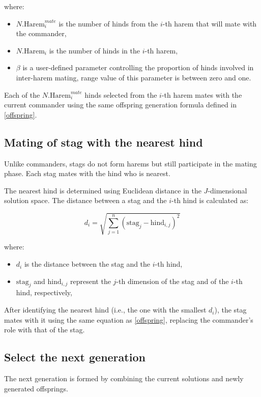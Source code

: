 \documentclass[pdflatex,sn-mathphys-num]{sn-jnl}%
\theoremstyle{thmstyleone}%
\theoremstyle{thmstyletwo}%
\theoremstyle{thmstylethree}%
\begin{document}
\noindent where:
\begin{itemize}
    \item $N.{\text{Harem}_i^{mate}}$ is the number of hinds from the $i$-th harem that will mate with the commander,
    \item $N.{\text{Harem}_i}$ is the number of hinds in the $i$-th harem,
    \item $\beta$ is a user-defined parameter controlling the proportion of hinds involved in inter-harem mating, range value of this parameter is between zero and one.
\end{itemize}

Each of the $N.{\text{Harem}_i^{mate}}$ hinds selected from the $i$-th harem mates with the current commander using the same offspring generation formula defined in \ref{offspring}. 

\subsection{Mating of stag with the nearest hind}\label{subsec4.8}
Unlike commanders, stags do not form harems but still participate in the mating phase. Each stag mates with the hind who is nearest.

The nearest hind is determined using Euclidean distance in the $J$-dimensional solution space. The distance between a stag and the $i$-th hind is calculated as:

\begin{equation}
d_i = \sqrt{ \sum_{j=1}^{n} (\text{stag}_j - \text{hind}_{i,j})^2 }
\end{equation}

\noindent where:
\begin{itemize}
    \item $d_i$ is the distance between the stag and the $i$-th hind,
    \item $\text{stag}_j$ and $\text{hind}_{i,j}$ represent the $j$-th dimension of the stag and of the $i$-th hind, respectively,
\end{itemize}

After identifying the nearest hind (i.e., the one with the smallest $d_i$), the stag mates with it using the same equation as \ref{offspring}, replacing the commander’s role with that of the stag.


\subsection{Select the next generation}\label{subsec4.9}
The next generation is formed by combining the current solutions and newly generated offsprings. 
\end{document}
